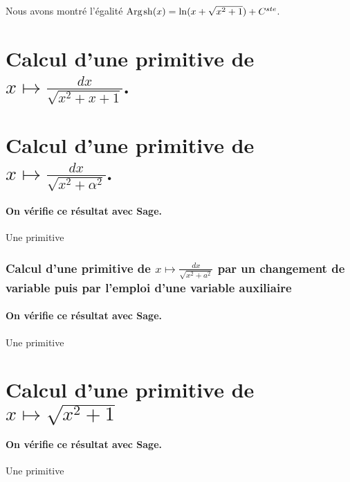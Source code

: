 \documentclass[a4paper,landscape,17pt]{extreport} %
\renewcommand{\sinh}{\mathop{\mathrm{sh}}}
\renewcommand{\arg}{\mathop{\mathrm{Arg}}}
\begin{document}
Nous avons montré l'égalité $\arg\mspace{-1mu}\sinh\nolimits(x) = \ln(x + \sqrt{x^2+1}) + C^{ste} $.



\section{Calcul d'une primitive de $  x \longmapsto  \frac{dx}{\sqrt{x^2+ x + 1} } $. }

\section{Calcul d'une primitive de $  x \longmapsto  \frac{dx}{\sqrt{x^2+ \alpha^2} } $. }

\paragraph{On vérifie ce résultat avec Sage.}
Une primitive 



\subsubsection{Calcul d'une primitive de $  x \longmapsto  \frac{dx}{\sqrt{x^2+ a^2} } $ par un changement de variable puis par l'emploi d'une variable auxiliaire} 

\paragraph{On vérifie ce résultat avec Sage.}
Une primitive 

\section{Calcul d'une primitive de $  x \longmapsto  \sqrt{x^2 + 1}  $ \label{sqrt-001} }

\paragraph{On vérifie ce résultat avec Sage.}
Une primitive 
\end{document}
